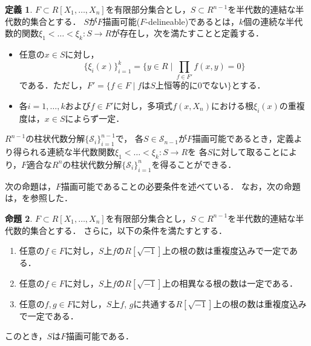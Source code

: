 \documentclass[uplatex, dvipdfmx]{jsarticle}
\numberwithin{equation}{section}
\newcommand{\calS}{\mathcal{S}}
\newcommand{\map}[3]{{#1}\colon{#2}\rightarrow{#3}}
\theoremstyle{definition}
\newtheorem{definition}{定義}[section]
\newtheorem{proposition}[definition]{命題}
\begin{document}
\begin{definition} 
     $F \subset R[X_1, \dots, X_n]$を有限部分集合とし，$S \subset R^{n-1}$を半代数的連結な半代数的集合とする．
     $S$が$F$描画可能($F$-delineable)であるとは，$k$個の連続な半代数的関数$\map{\xi_1<\dots<\xi_k}{S}{R}$が存在し，次を満たすことと定義する．
     \begin{itemize}
          \item 任意の$ x \in S $に対し，
          \begin{equation}
               \{\xi_i(x)\}_{i=1}^k = \{y \in R \mid \prod_{f \in F'}f(x,y)=0\}
          \end{equation}
          である．ただし，$F' = \{f \in F \mid \text{$f$は$S$上恒等的に$0$でない}\}$とする．
          \item 各$i=1, \dots, k$および$f \in F'$に対し，多項式$f(x,X_n)$における根$\xi_i(x)$の重複度は，$x\in S$によらず一定．
     \end{itemize}
\end{definition}

$R^{n-1}$の柱状代数分解$\{\calS_i\}_{i=1}^{n-1}$で，
各$S \in \calS_{n-1}$が$F$描画可能であるとき，定義より得られる連続な半代数関数$\map{\xi_1<\dots<\xi_k}{S}{R}$を
各$S$に対して取ることにより，$F$適合な$R^n$の柱状代数分解$\{\calS_i\}_{i=1}^n$を得ることができる．

次の命題は，$F$描画可能であることの必要条件を述べている．
なお，次の命題は，\cite[Proposition 5.14.]{MR2248869}を参照した．


\begin{proposition}\label{proposition:del}
     $F \subset R[X_1, \dots, X_n]$を有限部分集合とし，$S \subset R^{n-1}$を半代数的連結な半代数的集合とする．
     さらに，以下の条件を満たすとする．
     \begin{enumerate}
          \item \label{proposition:del-1}
          任意の$f \in F$に対し，$S$上$f$の$R[\sqrt{-1}]$上の根の数は重複度込みで一定である．
          \item \label{proposition:del-2}
          任意の$f \in F$に対し，$S$上$f$の$R[\sqrt{-1}]$上の相異なる根の数は一定である．
          \item \label{proposition:del-3}
          任意の$f, g \in F$に対し，$S$上$f$, $g$に共通する$R[\sqrt{-1}]$上の根の数は重複度込みで一定である．
     \end{enumerate}
     このとき，$S$は$F$描画可能である．
\end{proposition}
\end{document}
